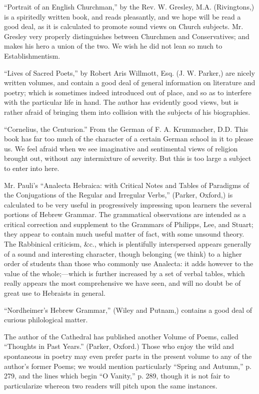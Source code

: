 ``Portrait of an English Churchman,'' by the Rev. W.
Gresley, M.A. (Rivingtons,) is a spiritedly written book, and reads
pleasantly, and we hope will be read a good deal, as it is calculated to
promote sound views on Church subjects. Mr. Gresley very properly
distinguishes between Churchmen and Conservatives; and makes his hero a
union of the two. We wish he did not lean so much to Establishmentism.

``Lives of Sacred Poets,'' by Robert Aris Willmott,
Esq. (J. W. Parker,) are nicely written volumes, and contain a good deal
of general information on literature and poetry; which is sometimes
indeed introduced out of place, and so as to interfere with the
particular life in hand. The author has evidently good views, but is
rather afraid of bringing them into collision with the subjects of his
biographies.

``Cornelius, the Centurion.'' From the German of F.
A. Krummacher, D.D. This book has far too much of the character of a
certain German school in it to please us. We feel afraid when we see
imaginative and sentimental views of religion brought out, without any
intermixture of severity. But this is too large a subject to enter into
here.

Mr. Pauli's ``Analecta Hebraica: with Critical Notes
and Tables of Paradigms of the Conjugations of the Regular and Irregular
Verbs,'' (Parker, Oxford,) is calculated to be very useful in
progressively impressing upon learners the several portions of Hebrew
Grammar. The grammatical observations are intended as a critical
correction and supplement to the Grammars of Philipps, Lee, and Stuart;
they appear to contain much useful matter of fact, with some unsound
theory. The Rabbinical criticism, \&c., which is plentifully
interspersed appears generally of a sound and interesting character,
though belonging (we think) to a higher order of students than those who
commonly use Analecta: it adds however to the value of the
whole;—which is further increased by a set
of verbal tables, which really appears the most comprehensive we
have seen, and will no doubt be of great use to Hebraists in general.

``Nordheimer's Hebrew Grammar,'' (Wiley and Putnam,)
contains a good deal of curious philological matter.

The author of the Cathedral has published another
Volume of Poems, called ``Thoughts in Past Years.'' (Parker, Oxford.)
Those who enjoy the wild and spontaneous in poetry may even prefer parts
in the present volume to any of the author's former Poems; we would
mention particularly ``Spring and Autumn,'' p. 279, and the lines which
begin ``O Vanity,'' p. 289, though it is not fair to particularize whereon
two readers will pitch upon the same instances.

